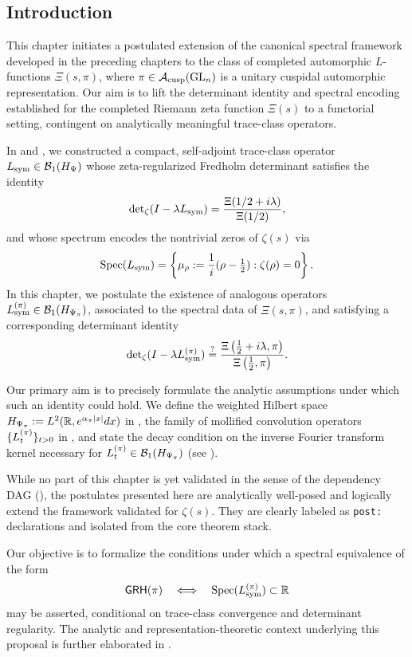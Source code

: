\subsection*{Introduction}
\label{sec:intro_spectral_generalization}

This chapter initiates a postulated extension of the canonical spectral framework developed in the preceding chapters to the class of completed automorphic \( L \)-functions \( \Xi(s, \pi) \), where \( \pi \in \mathcal{A}_{\mathrm{cusp}}(\mathrm{GL}_n) \) is a unitary cuspidal automorphic representation. Our aim is to lift the determinant identity and spectral encoding established for the completed Riemann zeta function \( \Xi(s) \) to a functorial setting, contingent on analytically meaningful trace-class operators.

In  and , we constructed a compact, self-adjoint trace-class operator \( L_{\mathrm{sym}} \in \mathcal{B}_1(H_{\Psi}) \) whose zeta-regularized Fredholm determinant satisfies the identity
\[
\det\nolimits_{\zeta}(I - \lambda L_{\mathrm{sym}}) = \frac{\Xi(1/2 + i\lambda)}{\Xi(1/2)},
\]
and whose spectrum encodes the nontrivial zeros of \( \zeta(s) \) via
\[
\operatorname{Spec}(L_{\mathrm{sym}}) = \left\{ \mu_\rho := \frac{1}{i}(\rho - \tfrac{1}{2}) : \zeta(\rho) = 0 \right\}.
\]
In this chapter, we postulate the existence of analogous operators \( L_{\mathrm{sym}}^{(\pi)} \in \mathcal{B}_1(H_{\Psi_{\pi}}) \), associated to the spectral data of \( \Xi(s, \pi) \), and satisfying a corresponding determinant identity
\[
\det\nolimits_{\zeta}(I - \lambda L_{\mathrm{sym}}^{(\pi)}) \overset{?}{=} \frac{\Xi\left(\tfrac{1}{2} + i\lambda, \pi\right)}{\Xi\left(\tfrac{1}{2}, \pi\right)}.
\]

Our primary aim is to precisely formulate the analytic assumptions under which such an identity could hold. We define the weighted Hilbert space \( H_{\Psi_{\pi}} := L^2(\mathbb{R}, e^{\alpha_{\pi} |x|} dx) \) in , the family of mollified convolution operators \( \{ L_t^{(\pi)} \}_{t > 0} \) in , and state the decay condition on the inverse Fourier transform kernel necessary for \( L_t^{(\pi)} \in \mathcal{B}_1(H_{\Psi_{\pi}}) \) (see ).

While no part of this chapter is yet validated in the sense of the dependency DAG (), the postulates presented here are analytically well-posed and logically extend the framework validated for \( \zeta(s) \). They are clearly labeled as \texttt{post:} declarations and isolated from the core theorem stack.

Our objective is to formalize the conditions under which a spectral equivalence of the form
\[
\mathsf{GRH}(\pi) \quad \Longleftrightarrow \quad \operatorname{Spec}(L_{\mathrm{sym}}^{(\pi)}) \subset \mathbb{R}
\]
may be asserted, conditional on trace-class convergence and determinant regularity. The analytic and representation-theoretic context underlying this proposal is further elaborated in .
